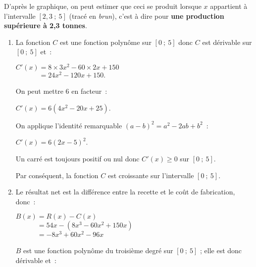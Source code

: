 \begin{corrige}
\begin{enumerate}
          D'après le graphique, on peut estimer que ceci se produit lorsque $x$ appartient à l'intervalle $[2,3~;~5]$ (tracé en \textit{brun}), c'est à dire pour \textbf{une production supérieure à 2,3 tonnes}.
          \par
     \end{enumerate}
     \par
     \par
     \begin{enumerate}
          \item La fonction $C$ est une fonction polynôme sur $[0~;~5]$ donc $C$ est dérivable sur $[0~;~5]$ et~:
          \par
          $C'(x)= 8 \times 3x^2 - 60 \times 2x + 150$\\
          $\phantom{C'(x)}= 24x^2 - 120x + 150.$
          \par
          On peut mettre $6$ en facteur~:
          \par
          $C'(x)= 6(4x^2-20x+25)$.
          \par
          On applique l'identité remarquable $(a-b)^2=a^2-2ab+b^2$~:
          \par
          $C'(x)= 6(2x-5)^2$.
          \par
          Un carré est toujours positif ou nul donc $C'(x) \geqslant 0$ sur $[0~;~5]$.
          \par
          Par conséquent, la fonction $C$ est croissante sur l'intervalle $[0~;~5]$.
          \par
          \par
          \item
          Le résultat net est la différence entre la recette et le coût de fabrication, donc~:
          \par
          $B(x)=R(x)-C(x)$\\
          $\phantom{B(x)}=54x-(8x^3-60x^2+150x)$\\
          $\phantom{B(x)}=-8x^3+60x^2-96x$
          \par
          $B$ est une fonction polynôme du troisième degré sur $[0~;~5]$ ; elle est donc dérivable et~:

\end{enumerate}
\end{corrige}

